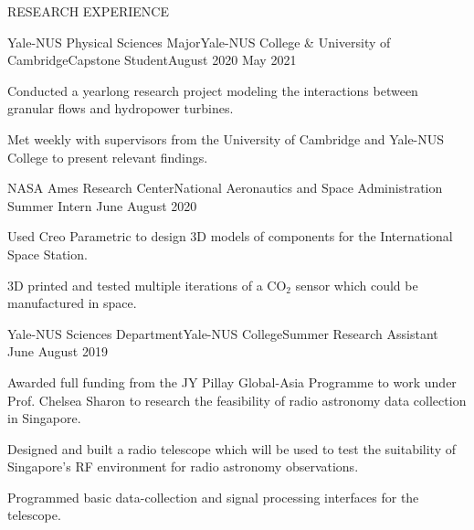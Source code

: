 \documentclass{resume} %
\begin{document}
\begin{rSection}{RESEARCH EXPERIENCE}

\begin{rSubsection}{Yale-NUS Physical Sciences Major}{Yale-NUS College \& University of Cambridge}{Capstone Student}{August 2020 {\textendash} May 2021}
\item Conducted a yearlong research project modeling the interactions between granular flows and hydropower turbines. 
\item Met weekly with supervisors from the University of Cambridge and Yale-NUS College to present relevant findings. 

\end{rSubsection}


\begin{rSubsection}{NASA Ames Research Center}{National Aeronautics and Space Administration} {Summer Intern} 
{June  {\textendash} August 2020}
\item  Used Creo Parametric to design 3D models of components for the International Space Station.
\item 3D printed and tested multiple iterations of a $\text{CO}_2$ sensor which could be manufactured in space.

\end{rSubsection}

\begin{rSubsection}{Yale-NUS Sciences Department}{Yale-NUS College}{Summer Research Assistant}{  June  {\textendash} August 2019}
\item Awarded full funding from the JY Pillay Global-Asia Programme to work under Prof. Chelsea Sharon to research the feasibility of radio astronomy data collection in Singapore. 
\item  Designed and built a radio telescope which will be used to test the suitability of  Singapore's RF environment for radio astronomy observations.
\item Programmed basic data-collection and signal processing interfaces for the telescope.


\end{rSubsection}
\end{rSection}
\end{document}
